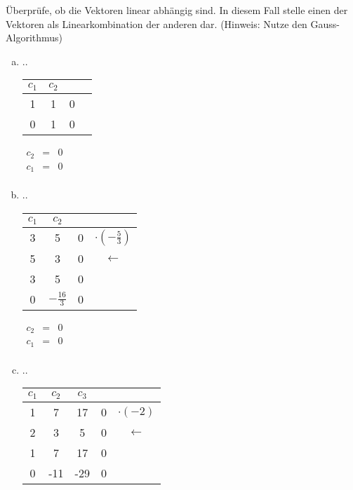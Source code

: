 		Überprüfe, ob die Vektoren linear abhängig sind.
		In diesem Fall stelle einen der Vektoren als Linearkombination der anderen dar.
		(Hinweis: Nutze den Gauss-Algorithmus)
		
				\begin{enumerate}[a)]
				
					\item ..
					\begin{tabular} {cc|cc}
					$c_1$ & $c_2$ & &\\
					\hline
					1 & 1 & 0 & \\
					0 & 1 & 0 & \\
					\end{tabular}
						
							$\begin{array} {ccc}
								c_2 & = & 0\\
								c_1 & = & 0\\
							\end{array}$
					
						 \item ..
				    	
							\begin{tabular} {cc|cc}
								$c_1$ & $c_2$ & &\\
								\hline
								3 & 5 & 0 & $\cdot(-\frac{5}{3})$\\
								5 & 3 & 0 & $\leftarrow$ \\
								\hline
								3 & 5 & 0 & \\
								0 & $-\frac{16}{3}$ & 0 & \\
							\end{tabular}
						
						
						
							$\begin{array} {ccc}
								c_2 & = & 0\\
								c_1 & = & 0\\
							\end{array}$
					

					
						
						
				   
						
				    \item ..
						
							\begin{tabular} {ccc|cc}
								$c_1$ & $c_2$ & $c_3$ & &\\
								\hline
								1 & 7 & 17 & 0 & $\cdot(-2)$ \\
								2 & 3 & 5 & 0 & $\leftarrow$ \\
								\hline
								1 & 7 & 17 & 0 & \\
								0 & -11 & -29 & 0 & \\
							\end{tabular}
						

\end{enumerate}
